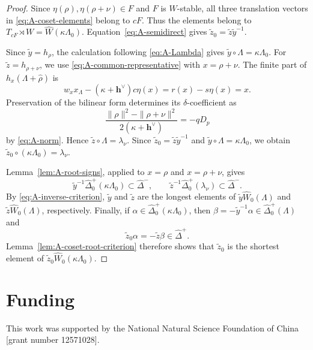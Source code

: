 \documentclass[11pt,a4paper]{amsart}
\theoremstyle{plain}
\numberwithin{equation}{section}
\newenvironment{pf}{\begin{proof}}{\end{proof}}
\begin{document}
\begin{pf}
Since \(\eta(\rho),\eta(\rho+\nu)\in F\) and \(F\) is
\(W\)-stable, all three translation vectors in
\eqref{eq:A-coset-elements} belong to \(cF\). Thus the elements
belong to \(T_{cF}\rtimes W=\widehat W(\kappa\Lambda_0)\).
Equation~\eqref{eq:A-semidirect} gives
\(\widetilde z_0=\widetilde z\widetilde y^{-1}\).

Since \(\widetilde y=h_\rho\), the calculation following
\eqref{eq:A-Lambda} gives
\(\widetilde y\circ\Lambda=\kappa\Lambda_0\).
For \(\widetilde z=h_{\rho+\nu}\), we use
\eqref{eq:A-common-representative} with \(x=\rho+\nu\). The finite part
of \(h_x(\Lambda+\widehat\rho)\) is
\[
w_xx_\Lambda-(\kappa+\mathbf{h}^\vee)c\eta(x)
=r(x)-s\eta(x)=x.
\]
Preservation of the bilinear form determines its \(\delta\)-coefficient
as
\[
\frac{\|\rho\|^2-\|\rho+\nu\|^2}{2(\kappa+\mathbf{h}^\vee)}
=-qD_p
\]
by \eqref{eq:A-norm}. Hence
\(\widetilde z\circ\Lambda=\lambda_\nu\). Since
\(\widetilde z_0=\widetilde z\widetilde y^{-1}\) and
\(\widetilde y\circ\Lambda=\kappa\Lambda_0\), we obtain
\(\widetilde z_0\circ(\kappa\Lambda_0)=\lambda_\nu\).

Lemma~\ref{lem:A-root-signs}, applied to \(x=\rho\) and \(x=\rho+\nu\),
gives
\[
\widetilde y^{-1}\widehat\Delta_0^+(\kappa\Lambda_0)
\subset\widehat\Delta^-,\qquad
\widetilde z^{-1}\widehat\Delta_0^+(\lambda_\nu)
\subset\widehat\Delta^-.
\]
By \eqref{eq:A-inverse-criterion}, \(\widetilde y\) and
\(\widetilde z\) are the longest elements of
\(\widetilde y\widehat W_0(\Lambda)\) and
\(\widetilde z\widehat W_0(\Lambda)\), respectively. Finally, if
\(\alpha\in\widehat\Delta_0^+(\kappa\Lambda_0)\), then
\(\beta=-\widetilde y^{-1}\alpha\in\widehat\Delta_0^+(\Lambda)\)
and
\[
\widetilde z_0\alpha=-\widetilde z\beta\in\widehat\Delta^+.
\]
Lemma~\ref{lem:A-coset-root-criterion} therefore shows that
\(\widetilde z_0\) is the shortest element of
\(\widetilde z_0\widehat W_0(\kappa\Lambda_0)\).
\end{pf}


\section*{Funding}
This work was supported by the National Natural Science Foundation of China
[grant number 12571028].
\end{document}
